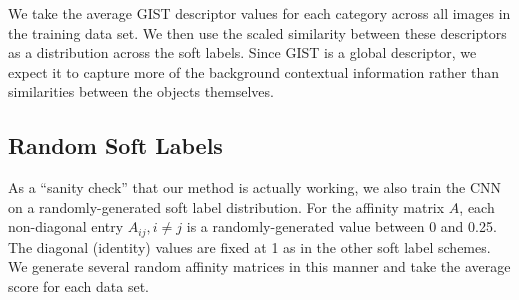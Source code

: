 We take the average GIST descriptor \cite{oliva2001modeling} values for each
category across all images in the training data set. We then use the scaled
similarity between these descriptors as a distribution across the soft labels.
Since GIST is a global descriptor, we expect it to capture more of the
background contextual information rather than similarities between the objects
themselves.


\subsection{Random Soft Labels}

As a ``sanity check'' that our method is actually working, we also train the
CNN on a randomly-generated soft label distribution. For the affinity matrix
$A$, each non-diagonal entry $A_{ij}, i \neq j$ is a randomly-generated value
between 0 and 0.25. The diagonal (identity) values are fixed at 1 as in the
other soft label schemes. We generate several random affinity matrices in this
manner and take the average score for each data set.

%

